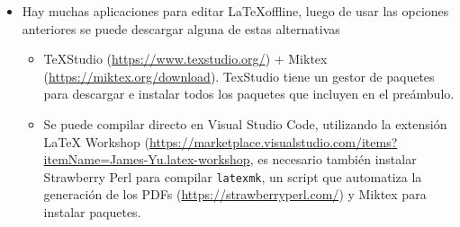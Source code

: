 \begin{itemize}
    \begin{itemize}
        \item Activar el modo draft para trabajar colaborativamente y corroborar que funciona el código
        \item Si el modo draft no es suficiente, se pueden comentar bloques de código con los comandos \textit{begin{comment}} y \textit{end{comment}}
    \end{itemize}
    \item Hay muchas aplicaciones para editar \LaTeX offline, luego de usar las opciones anteriores se puede descargar alguna de estas alternativas 
    \begin{itemize}
        \item TeXStudio (\url{https://www.texstudio.org/}) + Miktex (\url{https://miktex.org/download}). TexStudio tiene un gestor de paquetes para descargar e instalar todos los paquetes que incluyen en el preámbulo.
        \item Se puede compilar directo en Visual Studio Code, utilizando la extensión LaTeX Workshop (\url{https://marketplace.visualstudio.com/items?itemName=James-Yu.latex-workshop}, es necesario también instalar Strawberry Perl para compilar \texttt{latexmk}, un script que automatiza la generación de los PDFs (\url{https://strawberryperl.com/}) y Miktex para instalar paquetes.
    \end{itemize}
    

\end{itemize}
